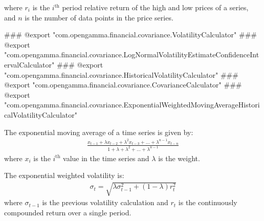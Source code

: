 where $r_i$ is the $i^\text{th}$ period relative return of the high and low prices of a series, and $n$ is the number of data points in the price series.


### @export "com.opengamma.financial.covariance.VolatilityCalculator"
### @export "com.opengamma.financial.covariance.LogNormalVolatilityEstimateConfidenceIntervalCalculator"
### @export "com.opengamma.financial.covariance.HistoricalVolatilityCalculator"
### @export "com.opengamma.financial.covariance.CovarianceCalculator"
### @export "com.opengamma.financial.covariance.ExponentialWeightedMovingAverageHistoricalVolatilityCalculator"


The exponential moving average of a time series is given by:
  \begin{eqnarray*}
  \frac{x_{t-1} + \lambda x_{t-2} + \lambda^2 x_{t-3} + \dots + \lambda^{n-1} x_{t-n}}{1 + \lambda + \lambda^2 + \dots + \lambda^{n-1}}
  \end{eqnarray*}
  where $x_i$ is the $i^\text{th}$ value in the time series and $\lambda$ is the weight.

  The exponential weighted volatility is:
  \begin{eqnarray*}
  \sigma_t = \sqrt{\lambda \sigma_{t-1}^2 + (1 - \lambda)r_t^2}
  \end{eqnarray*}
  where $\sigma_{t-1}$ is the previous volatility calculation and $r_t$ is the continuously compounded return over a single period.

